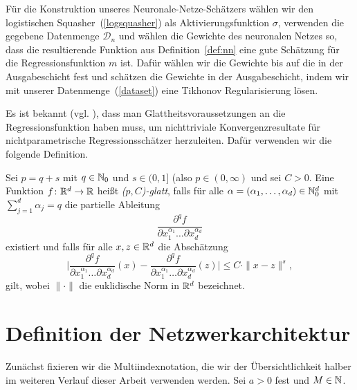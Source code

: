 Für die Konstruktion unseres Neuronale-Netze-Schätzers wählen wir den logistischen Squasher~(\ref{logsquasher}) als Aktivierungsfunktion $\sigma$, verwenden die gegebene Datenmenge $\mathcal{D}_n$ und wählen die Gewichte des neuronalen Netzes so, dass die resultierende Funktion aus Definition~\ref{def:nn} eine gute Schätzung für die Regressionsfunktion $m$ ist. Dafür wählen wir die Gewichte bis auf die in der Ausgabeschicht fest und schätzen die Gewichte in der Ausgabeschicht, indem wir mit unserer Datenmenge~(\ref{dataset}) eine Tikhonov Regularisierung \cite[Theorem 5.9]{Kress2012} lösen.

Es ist bekannt (vgl.\@ \cite[Theorem 7.2 und Problem 7.2]{DevLug96} \cite[Section 3]{DevWag80}), dass man Glattheitsvoraussetzungen an die Regressionsfunktion haben muss, um nichttriviale Konvergenzresultate für nichtparametrische Regressionsschätzer herzuleiten. Dafür verwenden wir die folgende Definition.
\begin{defn}[($p,C$)-Glattheit]
\label{def:pc}
   Sei $p = q + s$ mit $q \in \mathbb{N}_0$ und $s \in (0,1]$ (also $p \in (0, \infty)$ und sei $C > 0$. Eine Funktion $f\colon \mathbb{R}^d \to \mathbb{R}$ heißt \emph{($p, C$)-glatt}, falls für alle $\alpha = (\alpha_1,\dots,\alpha_d) \in \mathbb{N}_0^d$ mit $\sum_{j = 1}^{d}\alpha_j = q$ die partielle Ableitung 
   $$ \frac{\partial^qf}{\partial x_1^{\alpha_1}\dots\partial x_d^{\alpha_d}}$$
   existiert und falls für alle $x, z \in \mathbb{R}^d$ die Abschätzung 
   $$ \bigg|\frac{\partial^qf}{\partial x_1^{\alpha_1}\dots\partial x_d^{\alpha_d}}(x) - \frac{\partial^qf}{\partial x_1^{\alpha_1}\dots\partial x_d^{\alpha_d}}(z) \bigg| \leq C \cdot \|x - z\|^s,$$
   gilt, wobei $\|\cdot\|$ die euklidische Norm in $\mathbb{R}^d$ bezeichnet.  
\end{defn}

\section{Definition der Netzwerkarchitektur}
\label{subsec:2:1}
Zunächst fixieren wir die Multiindexnotation, die wir der Übersichtlichkeit halber im weiteren Verlauf dieser Arbeit verwenden werden. Sei $a > 0$ fest und $M \in \mathbb{N}$. 

